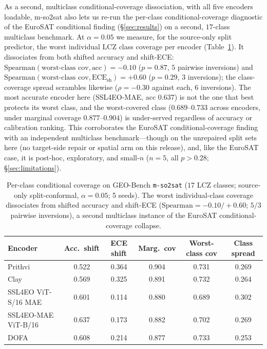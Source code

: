\documentclass[journal]{IEEEtran}
\renewcommand{\_}{\textunderscore\allowbreak}
\begin{document}
As a second, multiclass conditional-coverage dissociation, with all five encoders loadable, m-so2sat
also lets us re-run the per-class conditional-coverage diagnostic of the EuroSAT conditional finding
(\S\ref{sec:results}) on a second, $17$-class multiclass benchmark. At $\alpha{=}0.05$ we measure, for the
source-only split predictor, the worst individual LCZ class coverage per encoder (Table~\ref{tab:so2satcond}).
It dissociates from both shifted accuracy and shift-ECE:
$\mathrm{Spearman}(\text{worst-class cov},\text{acc})=-0.10$ ($p{=}0.87$, $5$ pairwise inversions) and
$\mathrm{Spearman}(\text{worst-class cov},\text{ECE}_{\mathrm{sh}})=+0.60$ ($p{=}0.29$, $3$ inversions);
the class-coverage spread scrambles likewise ($\rho=-0.30$ against each, $6$ inversions). The most accurate
encoder here (SSL4EO-MAE, acc $0.637$) is not the one that best protects its worst class, and the
worst-covered class ($0.689$--$0.733$ across encoders, under marginal coverage $0.877$--$0.904$) is
under-served regardless of accuracy or calibration ranking. This corroborates the EuroSAT
conditional-coverage finding with an independent multiclass benchmark---though on the unrepaired
split sets here (no target-side repair or spatial arm on this release), and, like the EuroSAT case, it is
post-hoc, exploratory, and small-$n$ ($n{=}5$, all $p>0.28$; \S\ref{sec:limitations}).

\begin{table}[!t]\centering\small
\caption{Per-class conditional coverage on GEO-Bench \texttt{m-so2sat} ($17$ LCZ classes; source-only
split-conformal, $\alpha{=}0.05$; 5 seeds). The worst individual-class coverage dissociates from shifted
accuracy and shift-ECE ($\mathrm{Spearman}=-0.10/+0.60$; $5/3$ pairwise inversions), a second
multiclass instance of the EuroSAT conditional-coverage collapse.}\label{tab:so2satcond}
\begin{tabular}{lccccc}
\toprule
Encoder & Acc.\ shift & ECE shift & Marg.\ cov & Worst-class cov & Class spread \\
\midrule
Prithvi             & 0.522 & 0.364 & 0.904 & 0.731 & 0.269 \\
Clay                & 0.569 & 0.325 & 0.891 & 0.732 & 0.264 \\
SSL4EO ViT-S/16 MAE & 0.601 & 0.114 & 0.880 & 0.689 & 0.302 \\
SSL4EO-MAE ViT-B/16 & 0.637 & 0.173 & 0.882 & 0.702 & 0.269 \\
DOFA                & 0.608 & 0.214 & 0.877 & 0.733 & 0.253 \\
\bottomrule
\end{tabular}
\end{table}
\end{document}
